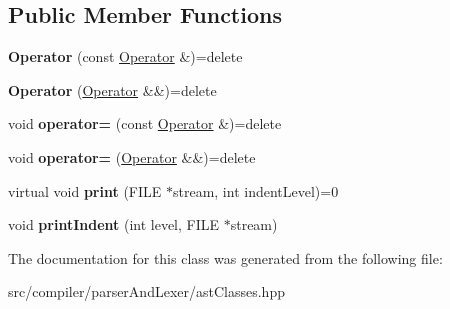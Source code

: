 \subsection*{Public Member Functions}
\begin{DoxyCompactItemize}
\item 
{\bfseries Operator} (const \hyperlink{classslang__AST__NODES_1_1Operator}{Operator} \&)=delete\hypertarget{classslang__AST__NODES_1_1Operator_a2133487159af1697624113aee8cdf0fe}{}\label{classslang__AST__NODES_1_1Operator_a2133487159af1697624113aee8cdf0fe}

\item 
{\bfseries Operator} (\hyperlink{classslang__AST__NODES_1_1Operator}{Operator} \&\&)=delete\hypertarget{classslang__AST__NODES_1_1Operator_a3e5978ea07f080b1f02d974b490fda88}{}\label{classslang__AST__NODES_1_1Operator_a3e5978ea07f080b1f02d974b490fda88}

\item 
void {\bfseries operator=} (const \hyperlink{classslang__AST__NODES_1_1Operator}{Operator} \&)=delete\hypertarget{classslang__AST__NODES_1_1Operator_ac4bdfbee38f554f4ddb2b0463417cd18}{}\label{classslang__AST__NODES_1_1Operator_ac4bdfbee38f554f4ddb2b0463417cd18}

\item 
void {\bfseries operator=} (\hyperlink{classslang__AST__NODES_1_1Operator}{Operator} \&\&)=delete\hypertarget{classslang__AST__NODES_1_1Operator_ad9cc76b721856b7e731d4a1dfb5a986b}{}\label{classslang__AST__NODES_1_1Operator_ad9cc76b721856b7e731d4a1dfb5a986b}

\item 
virtual void {\bfseries print} (F\+I\+LE $\ast$stream, int indent\+Level)=0\hypertarget{classslang__AST__NODES_1_1Operator_ae09e8d2fb6dfe2eb76acf11e5b60bfe0}{}\label{classslang__AST__NODES_1_1Operator_ae09e8d2fb6dfe2eb76acf11e5b60bfe0}

\item 
void {\bfseries print\+Indent} (int level, F\+I\+LE $\ast$stream)\hypertarget{classslang__AST__NODES_1_1Operator_a55dea6860e708b5bfdfc4f93af1f6370}{}\label{classslang__AST__NODES_1_1Operator_a55dea6860e708b5bfdfc4f93af1f6370}

\end{DoxyCompactItemize}


The documentation for this class was generated from the following file\+:\begin{DoxyCompactItemize}
\item 
src/compiler/parser\+And\+Lexer/ast\+Classes.\+hpp\end{DoxyCompactItemize}
